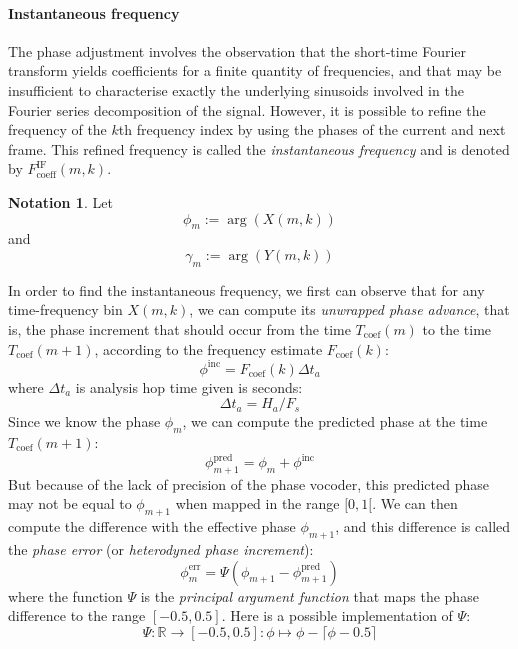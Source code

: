 \documentclass[letterpaper]{article}
\theoremstyle{definition}
\newtheorem*{notation}{Notation}
\theoremstyle{remark}
\theoremstyle{plain}
\begin{document}
\paragraph{Instantaneous frequency}
The phase adjustment involves the observation that the short-time Fourier
transform yields coefficients for a finite quantity of frequencies, and that may
be insufficient to characterise exactly the underlying sinusoids involved in the
Fourier series decomposition of the signal. However, it is possible to refine
the frequency of the \(k\)th frequency index by using the phases of the current
and next frame. This refined frequency is called the \emph{instantaneous
frequency} and is denoted by \(F_{\text{coeff}}^{\text{IF}}(m,k)\).
\begin{notation}
Let \[\phi_m:=\arg(X(m,k))\]
and \[\gamma_m:=\arg(Y(m,k))\]
\end{notation}
In order to find the instantaneous frequency, we first can observe that for any
time-frequency bin \(X(m,k)\), we can compute its \emph{unwrapped phase
advance}, that is, the phase increment that should occur from the time
\(T_{\text{coef}}(m)\) to the time \(T_{\text{coef}}(m+1)\), according to the
frequency estimate \(F_{\text{coef}}(k)\):
\begin{equation}
    \phi^{\text{inc}}=F_{\text{coef}}(k) \Delta t_a
\end{equation}
where \(\Delta t_a\) is analysis hop time given is seconds:
\begin{equation}
    \Delta t_a=H_a/F_s
\end{equation}
Since we know the phase \(\phi_m\), we can compute the predicted phase at
the time \(T_{\text{coef}}(m+1)\):
\begin{equation}
    \phi^{\text{pred}}_{m+1}=\phi_m + \phi^{\text{inc}}
\end{equation}
But because of the lack of precision of the phase vocoder, this predicted phase
may not be equal to \(\phi_{m+1}\) when mapped in the range \([0, 1[\).
We can then compute the difference with the effective phase \(\phi_{m+1}\), and
this difference is called the \emph{phase error} (or \emph{heterodyned phase
increment}):
\begin{equation}
    \phi^{\text{err}}_m=\Psi(\phi_{m+1} - \phi^{\text{pred}}_{m+1})
\end{equation}
where the function \(\Psi\) is the \emph{principal argument function} that maps
the phase difference to the range \([-0.5, 0.5]\).
Here is a possible implementation of \(\Psi\):
\begin{equation}
    \Psi:\mathbb{R}\to[-0.5,0.5]:\phi\mapsto \phi - \lceil \phi-0.5 \rceil
\end{equation}
\end{document}
